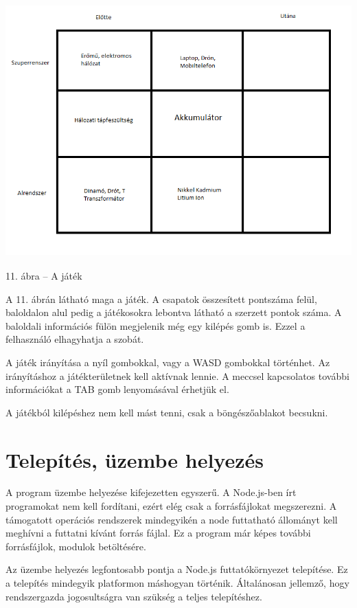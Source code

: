 \documentclass[]{article}
\begin{document}
\includegraphics[width=5.90556in,height=3.82737in]{media/image8.png}

11. ábra -- A játék

A 11. ábrán látható maga a játék. A csapatok összesített pontszáma
felül, baloldalon alul pedig a játékosokra lebontva látható a szerzett
pontok száma. A baloldali információs fülön megjelenik még egy kilépés
gomb is. Ezzel a felhasználó elhagyhatja a szobát.

A játék irányítása a nyíl gombokkal, vagy a WASD gombokkal történhet. Az
irányításhoz a játékterületnek kell aktívnak lennie. A meccsel
kapcsolatos további információkat a TAB gomb lenyomásával érhetjük el.

A játékból kilépéshez nem kell mást tenni, csak a böngészőablakot
becsukni.


\section{Telepítés, üzembe
helyezés}

A program üzembe helyezése kifejezetten egyszerű. A Node.js-ben írt
programokat nem kell fordítani, ezért elég csak a forrásfájlokat
megszerezni. A támogatott operációs rendszerek mindegyikén a node
futtatható állományt kell meghívni a futtatni kívánt forrás fájlal. Ez a
program már képes további forrásfájlok, modulok betöltésére.

Az üzembe helyezés legfontosabb pontja a Node.js futtatókörnyezet
telepítése. Ez a telepítés mindegyik platformon máshogyan történik.
Általánosan jellemző, hogy rendszergazda jogosultságra van szükség a
teljes telepítéshez.
\end{document}
